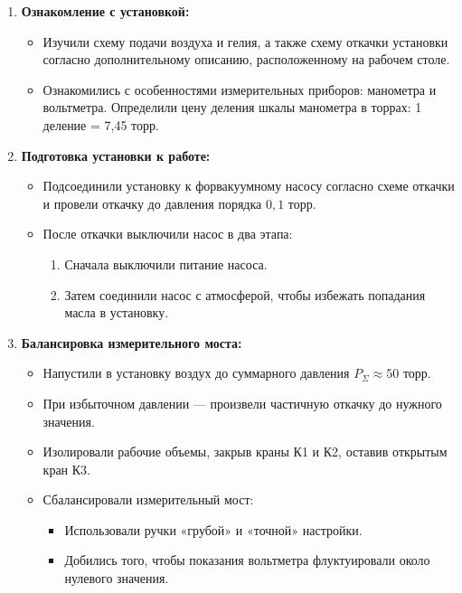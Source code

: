 \documentclass[a4paper,12pt]{article}
\begin{document}
        \begin{enumerate}
    \item \textbf{Ознакомление с установкой:}
    \begin{itemize}
        \item Изучили схему подачи воздуха и гелия, а также схему откачки установки согласно дополнительному описанию, расположенному на рабочем столе.
        \item Ознакомились с особенностями измерительных приборов: манометра и вольтметра. Определили цену деления шкалы манометра в торрах: 1 деление = 7,45 торр.
      
    \end{itemize}

    \item \textbf{Подготовка установки к работе:}
    \begin{itemize}
        \item Подсоединили установку к форвакуумному насосу согласно схеме откачки и провели откачку до давления порядка $0{,}1$ торр.
        \item После откачки выключили насос в два этапа:
        \begin{enumerate}
            \item Сначала выключили питание насоса.
            \item Затем соединили насос с атмосферой, чтобы избежать попадания масла в установку.
        \end{enumerate}
    \end{itemize}

    \item \textbf{Балансировка измерительного моста:}
    \begin{itemize}
        \item Напустили в установку воздух до суммарного давления $P_\Sigma \approx 50$ торр.
        \item При избыточном давлении — произвели частичную откачку до нужного значения.
        \item Изолировали рабочие объемы, закрыв краны К1 и К2, оставив открытым кран К3.
        \item Сбалансировали измерительный мост:
        \begin{itemize}
            \item Использовали ручки «грубой» и «точной» настройки.
            \item Добились того, чтобы показания вольтметра флуктуировали около нулевого значения.
        \end{itemize}
    \end{itemize}


\end{enumerate}
\end{document}
